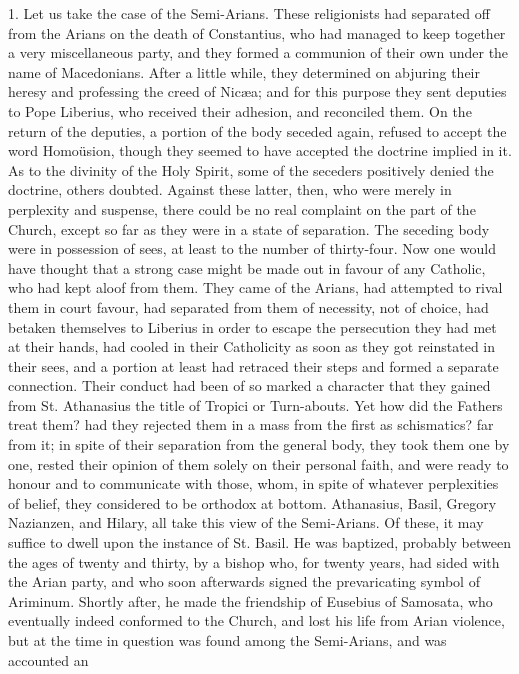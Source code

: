 1. Let us take the case of the Semi-Arians. These
religionists had separated off from the Arians on the death of
Constantius, who had managed to keep together a very miscellaneous
party, and they formed a communion of their own under the name of
Macedonians. After a little while, they determined on abjuring their
heresy and professing the creed of Nicæa; and for this purpose they
sent deputies to Pope Liberius, who received their adhesion, and
reconciled them. On the return of the deputies, a portion of the body
seceded again, refused to accept the word Homoüsion, though they
seemed to have accepted the doctrine implied in it. As to the divinity
of the Holy Spirit, some of the seceders positively denied the
doctrine, others doubted. Against these latter, then, who were merely
in perplexity and suspense, there could be no real complaint on the
part of the Church, except so far as they were in a state of
separation. The seceding body were in possession of sees, at least to
the number of thirty-four. Now one would have thought that a strong
case might be made out in favour of any Catholic, who had kept aloof
from them. They came of the Arians, had attempted to rival them in
court favour, had separated from them of necessity, not of choice, had
betaken themselves to Liberius in order to escape the persecution they
had met at their hands, had cooled in their Catholicity as soon as
they got reinstated in their sees, and a portion at least had retraced
their steps and formed a separate connection. Their conduct had been
of so marked a character that they gained from St. Athanasius the
title of Tropici or Turn-abouts. Yet how did the Fathers treat them?
had they rejected them in a mass from the first as schismatics? far
from it; in spite of their separation from the general body, they took
them one by one, rested their opinion of them solely on their personal
faith, and were ready to honour and to communicate with those, whom,
in spite of whatever perplexities of belief, they considered to be
orthodox at bottom. Athanasius, Basil, Gregory Nazianzen, and Hilary,
all take this view of the Semi-Arians. Of these, it may suffice to
dwell upon the instance of St. Basil. He was baptized, probably
between the ages of twenty and thirty, by a bishop who, for twenty
years, had sided with the Arian party, and who soon afterwards signed
the prevaricating symbol of Ariminum. Shortly after, he made the
friendship of Eusebius of Samosata, who eventually indeed conformed to
the Church, and lost his life from Arian violence, but at the
time in question was found among the Semi-Arians, and was accounted an
